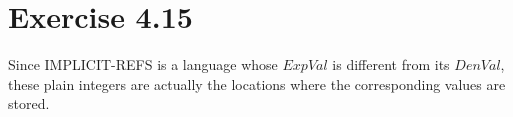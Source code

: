 \section*{Exercise 4.15}

Since IMPLICIT-REFS is a language whose $ExpVal$ is different from its $DenVal$,
these plain integers are actually the locations where
the corresponding values are stored.
